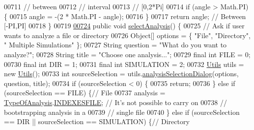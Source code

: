 \begin{DoxyCode}
{00711                                                                     \textcolor{comment}{// between}
00712                                                                     \textcolor{comment}{// interval}
00713                                                                     \textcolor{comment}{// [0,2*Pi]}
00714     \textcolor{keywordflow}{if} (angle > Math.PI) \{
00715       angle = -(2 * Math.PI - angle);
00716     \}
00717     \textcolor{keywordflow}{return} angle; \textcolor{comment}{// Between [-PI,PI]}
00718   \}
00719 
\hypertarget{_chemotaxis_8java_source_l00724}{}\hyperlink{classanalysis_1_1_chemotaxis_aef66a58ab7f95817a68a3429550562fc}{00724}   \textcolor{keyword}{public} \textcolor{keywordtype}{void} \hyperlink{classanalysis_1_1_chemotaxis_aef66a58ab7f95817a68a3429550562fc}{selectAnalysis}() \{
00725     \textcolor{comment}{// Ask if user wants to analyze a file or directory}
00726     Object[] options = \{ \textcolor{stringliteral}{"File"}, \textcolor{stringliteral}{"Directory"}, \textcolor{stringliteral}{" Multiple Simulations"} \};
00727     String question = \textcolor{stringliteral}{"What do you want to analyze?"};
00728     String title = \textcolor{stringliteral}{"Choose one analysis..."};
00729     \textcolor{keyword}{final} \textcolor{keywordtype}{int} FILE = 0;
00730     \textcolor{keyword}{final} \textcolor{keywordtype}{int} DIR = 1;
00731     \textcolor{keyword}{final} \textcolor{keywordtype}{int} SIMULATION = 2;
00732     \hyperlink{classfunctions_1_1_utils}{Utils} utils = \textcolor{keyword}{new} \hyperlink{classfunctions_1_1_utils}{Utils}();
00733     \textcolor{keywordtype}{int} sourceSelection = utils.\hyperlink{classfunctions_1_1_utils_a0e53c856e8bb35342f949c2f320d0e74}{analysisSelectionDialog}(options, question, title);
00734     \textcolor{keywordflow}{if} (sourceSelection < 0) \{
00735       \textcolor{keywordflow}{return};
00736     \} \textcolor{keywordflow}{else} \textcolor{keywordflow}{if} (sourceSelection == FILE) \{\textcolor{comment}{// File}
00737       analysis = \hyperlink{enumanalysis_1_1_chemotaxis_1_1_type_of_analysis}{TypeOfAnalysis}.\hyperlink{enumanalysis_1_1_chemotaxis_1_1_type_of_analysis_a2d2e1e42ff8abcd21e8ddb4d502d9ec3}{INDEXESFILE}; \textcolor{comment}{// It's not possible to carry on}
00738                                              \textcolor{comment}{// bootstrapping analysis in a}
00739                                              \textcolor{comment}{// single file}
00740     \} \textcolor{keywordflow}{else} \textcolor{keywordflow}{if} (sourceSelection == DIR || sourceSelection == SIMULATION) \{\textcolor{comment}{// Directory}
}
\end{DoxyCode}

